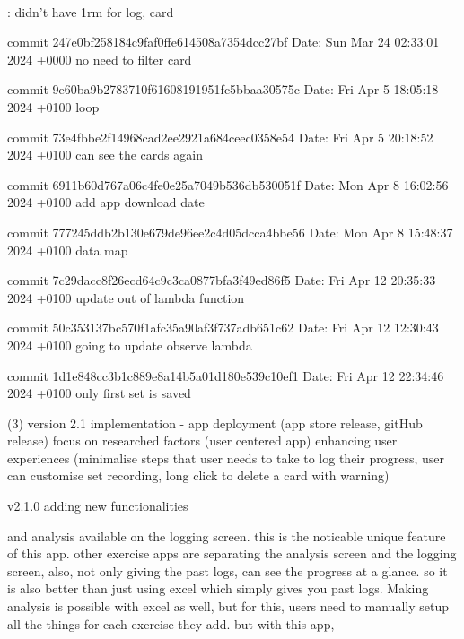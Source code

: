 \\ : 
didn't have 1rm for log, card


commit 247e0bf258184c9faf0ffe614508a7354dcc27bf
Date:   Sun Mar 24 02:33:01 2024 +0000
    no need to filter card

commit 9e60ba9b2783710f61608191951fc5bbaa30575c
Date:   Fri Apr 5 18:05:18 2024 +0100
    loop

commit 73e4fbbe2f14968cad2ee2921a684ceec0358e54
Date:   Fri Apr 5 20:18:52 2024 +0100
    can see the cards again

commit 6911b60d767a06c4fe0e25a7049b536db530051f
Date:   Mon Apr 8 16:02:56 2024 +0100
    add app download date

commit 777245ddb2b130e679de96ee2c4d05dcca4bbe56
Date:   Mon Apr 8 15:48:37 2024 +0100
    data map

commit 7c29dacc8f26ecd64c9c3ca0877bfa3f49ed86f5
Date:   Fri Apr 12 20:35:33 2024 +0100
    update out of lambda function

commit 50c353137bc570f1afc35a90af3f737adb651c62
Date:   Fri Apr 12 12:30:43 2024 +0100
    going to update observe lambda


commit 1d1e848cc3b1c889e8a14b5a01d180e539c10ef1
Date:   Fri Apr 12 22:34:46 2024 +0100
    only first set is saved


(3) version 2.1 implementation - app deployment (app store release, gitHub release)
focus on researched factors (user centered app)
enhancing user experiences
(minimalise steps that user needs to take to log their progress, user can customise set recording, long click to delete a card with warning)



\version v2.1.0 {
    adding new functionalities
} 










and analysis available on the logging screen. 
this is the noticable unique feature of this app. 
other exercise apps are separating the analysis screen and the logging screen, 
also, not only giving the past logs, can see the progress at a glance. 
so it is also better than just using excel which simply gives you past logs.
Making analysis is possible with excel as well, but for this, users need to manually setup all the things for each exercise they add.
but with this app, 



